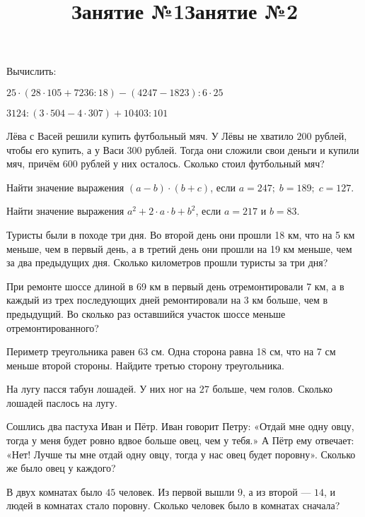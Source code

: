 \title{Занятие №1}
\begin{listofex}
	\item Вычислить:
	\begin{enumcols}[itemcolumns=2]
		\item \( 25\cdot(28\cdot105+7236:18)-(4247-1823):6\cdot25 \)
		\item \( 3124:(3\cdot504-4\cdot307)+10403:101 \)
	\end{enumcols}
	\item Лёва с Васей решили купить футбольный мяч. У Лёвы не хватило \( 200 \) рублей, чтобы его
	купить, а у Васи \( 300 \) рублей. Тогда они сложили свои деньги и купили мяч,
	причём \( 600 \) рублей у них осталось. Сколько стоил футбольный мяч?
	\item Найти значение выражения \( (a-b)\cdot(b+c) \), если \( a=247;\; b=189;\; c=127 \).
	\item Найти значение выражения \( a^2+2\cdot a\cdot b + b^2 \), если \( a=217 \) и \( b=83 \).
\end{listofex}
\newpage
\title{Занятие №2}
\begin{listofex}
	\item Туристы были в походе три дня. Во второй день они прошли 18 км, что на 5 км меньше,
	чем в первый день, а в третий день они прошли на 19 км меньше, чем за два предыдущих дня.
	Сколько километров прошли туристы за три дня?
	\item При ремонте шоссе длиной в 69 км в первый день отремонтировали 7 км, а в каждый из
	трех последующих дней ремонтировали на 3 км больше, чем в предыдущий. Во сколько раз
	оставшийся участок шоссе меньше отремонтированного?
	\item Периметр треугольника равен 63 см. Одна сторона равна 18 см, что на 7 см меньше второй стороны. Найдите третью сторону треугольника.
	\item На лугу пасся табун лошадей. У них ног на \( 27 \) больше, чем голов. Сколько лошадей паслось на лугу.
	\item Сошлись два пастуха Иван и Пётр. Иван говорит Петру: «Отдай мне одну овцу,
	тогда у меня будет ровно вдвое больше овец, чем у тебя.» А Пётр ему отвечает: «Нет!
	Лучше ты мне отдай одну овцу, тогда у нас овец будет поровну». Сколько же было овец у
	каждого?
	\item В двух комнатах было \( 45 \) человек. Из первой вышли \( 9 \), а из второй --- \( 14 \), и людей в комнатах стало поровну. Сколько человек было в комнатах сначала?
\end{listofex}
